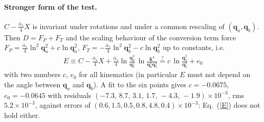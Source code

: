 \documentclass[11pt,a4paper]{article}
\renewcommand{\v}[1]{\bm{#1}}
\newcommand{\ab}{\bar\alpha_s}
\begin{document}
\paragraph{Stronger form of the test.} $C-\frac{\ab}4X$ is invariant under rotations and under a common rescaling of $(\v q_a,\v q_b)$. Then $D=F_P+F_T$ and the scaling behaviour of the conversion term force $F_P=\frac{\ab}4\ln^2\v q_a^2+c\ln\v q_a^2$, $F_T=-\frac{\ab}{4}\ln^2\v q_b^2-c\ln\v q_b^2$ up to constants, i.e.
\begin{align}
E\equiv C-\frac{\ab}{4}X+\frac{\ab}{4}\ln\frac{\v q_a^2}{\v q_b^2}\,\ln\frac{\v k^4}{\v q_a^2\v q_b^2}\overset{?}{=}c\,\ln\frac{\v q_a^2}{\v q_b^2}+e_0\label{E}
\end{align}
with two numbers $c$, $e_0$ for all kinematics (in particular $E$ must not depend on the angle between $\v q_a$ and $\v q_b$). A fit to the six points gives $c=-0.0675$, $e_0=-0.0645$ with residuals $(-7.3,\,8.7,\,3.1,\,1.7,\,-4.3,\,-1.9)\times10^{-3}$, rms $5.2\times10^{-3}$, against errors of $(0.6,1.5,0.5,0.8,4.8,0.4)\times10^{-3}$: Eq.~(\ref{E}) does not hold either.%
\end{document}
